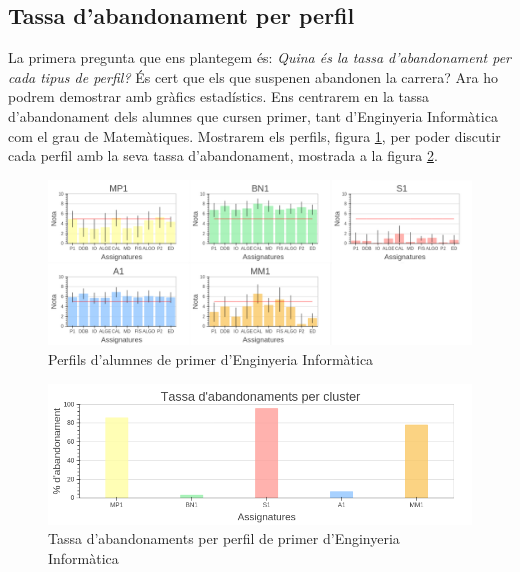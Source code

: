 \documentclass[12pt,a4paper,catalan]{article}
\begin{document}
\newpage

\subsection{Tassa d'abandonament per perfil}
La primera pregunta que ens plantegem és: \textit{Quina és la tassa d'abandonament per cada tipus de perfil?} És cert que els que suspenen abandonen la carrera? Ara ho podrem demostrar amb gràfics estadístics. Ens centrarem en la tassa d'abandonament dels alumnes que cursen primer, tant d'Enginyeria Informàtica com el grau de Matemàtiques. Mostrarem els perfils, figura \ref{fig:tap}, per poder discutir cada perfil amb la seva tassa d'abandonament, mostrada a la figura \ref{fig:abandonamentprimer}.

\begin{figure}[h]
\centering
\includegraphics[width=\linewidth]{img/perfils_primer_info.png}
\caption{Perfils d'alumnes de primer d'Enginyeria Informàtica}
\label{fig:tap}
\end{figure}

\begin{figure}[h]
\centering
\includegraphics[width=\linewidth]{img/abandonaments_primer_info.png}
\caption{Tassa d'abandonaments per perfil de primer d'Enginyeria Informàtica}
\label{fig:abandonamentprimer}
\end{figure}
\end{document}
